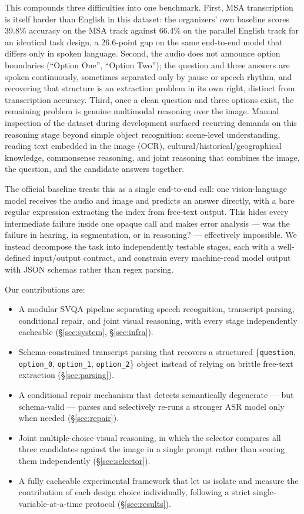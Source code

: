 \documentclass[11pt]{article}
\begin{document}
This compounds three difficulties into one benchmark. First, MSA transcription is itself harder than English in this dataset: the organizers' own baseline scores 39.8\% accuracy on the MSA track against 66.4\% on the parallel English track for an identical task design, a 26.6-point gap on the same end-to-end model that differs only in spoken language. Second, the audio does not announce option boundaries (``Option One'', ``Option Two''); the question and three answers are spoken continuously, sometimes separated only by pause or speech rhythm, and recovering that structure is an extraction problem in its own right, distinct from transcription accuracy. Third, once a clean question and three options exist, the remaining problem is genuine multimodal reasoning over the image. Manual inspection of the dataset during development surfaced recurring demands on this reasoning stage beyond simple object recognition: scene-level understanding, reading text embedded in the image (OCR), cultural/historical/geographical knowledge, commonsense reasoning, and joint reasoning that combines the image, the question, and the candidate answers together.

The official baseline treats this as a single end-to-end call: one vision-language model receives the audio and image and predicts an answer directly, with a bare regular expression extracting the index from free-text output. This hides every intermediate failure inside one opaque call and makes error analysis --- was the failure in hearing, in segmentation, or in reasoning? --- effectively impossible. We instead decompose the task into independently testable stages, each with a well-defined input/output contract, and constrain every machine-read model output with JSON schemas rather than regex parsing.

Our contributions are:
\begin{itemize}
  \item A modular SVQA pipeline separating speech recognition, transcript parsing, conditional repair, and joint visual reasoning, with every stage independently cacheable (\S\ref{sec:system}, \S\ref{sec:infra}).
  \item Schema-constrained transcript parsing that recovers a structured \{\texttt{question}, \texttt{option\_0}, \texttt{option\_1}, \texttt{option\_2}\} object instead of relying on brittle free-text extraction (\S\ref{sec:parsing}).
  \item A conditional repair mechanism that detects semantically degenerate --- but schema-valid --- parses and selectively re-runs a stronger ASR model only when needed (\S\ref{sec:repair}).
  \item Joint multiple-choice visual reasoning, in which the selector compares all three candidates against the image in a single prompt rather than scoring them independently (\S\ref{sec:selector}).
  \item A fully cacheable experimental framework that let us isolate and measure the contribution of each design choice individually, following a strict single-variable-at-a-time protocol (\S\ref{sec:results}).
\end{itemize}
\end{document}
